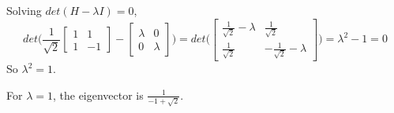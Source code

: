 Solving $det(H - \lambda I) = 0$, 
$$det\Bigg(\frac{1}{\sqrt{2}} \begin{bmatrix}
1 & 1 \\
1 & -1
\end{bmatrix} - \begin{bmatrix}
\lambda & 0 \\
0 & \lambda
\end{bmatrix} \Bigg) = det\Bigg( \begin{bmatrix}
\frac{1}{\sqrt{2}} - \lambda & \frac{1}{\sqrt{2}} \\
\frac{1}{\sqrt{2}} & -\frac{1}{\sqrt{2}} - \lambda
\end{bmatrix}\Bigg) = \lambda^{2} - 1 = 0$$
So $\lambda^{2} = 1$.

For $\lambda = 1$, the eigenvector is $\frac{1}{-1 + \sqrt{2}}$.